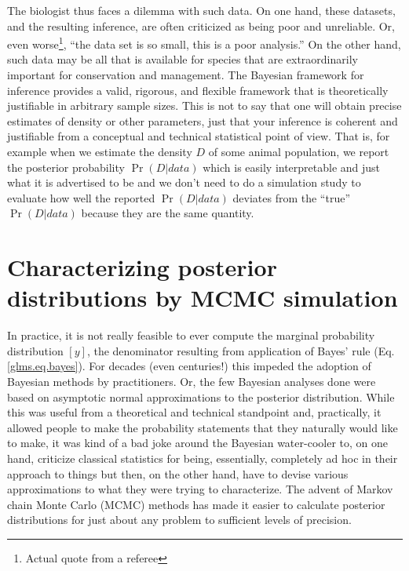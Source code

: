 The biologist thus faces a dilemma with such data. On one hand, these
datasets, and the resulting inference, are often criticized as being
poor and unreliable. Or, even worse\footnote{Actual quote from a
  referee}, ``the data set is so small, this is a poor analysis.''  On
the other hand, such data may be all that is available for species
that are extraordinarily important for conservation and management.
The Bayesian framework for inference provides a valid, rigorous, and
flexible framework that is theoretically justifiable in arbitrary
sample sizes. This is not to say that one will obtain precise
estimates of density or other parameters, just that your inference is
coherent and justifiable from a conceptual and technical statistical
point of view. That is, for example when we estimate the density $D$ of some animal population, we report the posterior probability
$\Pr(D|data)$ which is easily interpretable and just what it is
advertised to be and we don't need to do a simulation study to
evaluate how well the reported $\Pr(D|data)$ deviates from the
``true'' $\Pr(D|data)$ because they are the same quantity.

\section{Characterizing posterior distributions by MCMC simulation}

In practice, it is not really feasible to ever compute the marginal
probability distribution $[y]$, the denominator resulting from
application of Bayes' rule
(Eq. \ref{glms.eq.bayes}). For decades (even centuries!) this impeded the adoption of
Bayesian methods by practitioners. Or, the few Bayesian analyses done
were based on asymptotic normal approximations to the posterior
distribution. While this was useful from a theoretical and
technical standpoint and, practically, it allowed people to make the
probability statements that they naturally would like to make, it was
kind of a bad joke around the Bayesian water-cooler to, on one hand,
criticize classical statistics for being, essentially, completely ad
hoc in their approach to things but then, on the other hand, have to
devise various approximations to what they were trying to
characterize. The advent of Markov chain Monte Carlo (MCMC) methods
has made it easier to calculate posterior distributions for just about
any problem to sufficient levels of precision.

